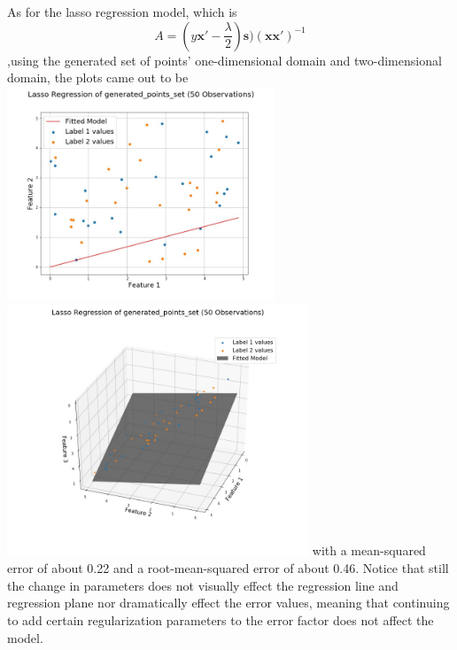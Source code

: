 \documentclass[a4paper,12pt]{IEEEtran}
\begin{document}
As for the lasso regression model, which is $$\textit{A} = (\textit{y}\textbf{x}' - \frac{\lambda}{2})\textbf{s})(\textbf{x}\textbf{x}')^{-1}$$,using the generated set of points' one-dimensional domain and two-dimensional domain, the plots came out to be \includegraphics[width=8cm]{lasso_reg_1d_generated_points_set} \includegraphics[width=9cm]{lasso_reg_2d_generated_points_set} with a mean-squared error of about 0.22 and a root-mean-squared error of about 0.46. Notice that still the change in parameters does not visually effect the regression line and regression plane nor dramatically effect the error values, meaning that continuing to add certain regularization parameters to the error factor does not affect the model.
\end{document}
